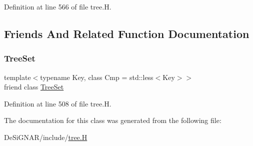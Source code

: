 Definition at line 566 of file tree.\+H.



\subsection{Friends And Related Function Documentation}
\mbox{\label{class_designar_1_1_tree_set_1_1_preorder_iterator_a7caa42294700d2a60905ec3458a7cd8a}} 
\subsubsection{\texorpdfstring{Tree\+Set}{TreeSet}}
{\footnotesize\ttfamily template$<$typename Key, class Cmp = std\+::less$<$\+Key$>$$>$ \\
friend class \hyperlink{class_designar_1_1_tree_set}{Tree\+Set}\hspace{0.3cm}{\ttfamily [friend]}}



Definition at line 508 of file tree.\+H.



The documentation for this class was generated from the following file\+:\begin{DoxyCompactItemize}
\item 
De\+Si\+G\+N\+A\+R/include/\hyperlink{tree_8_h}{tree.\+H}\end{DoxyCompactItemize}
